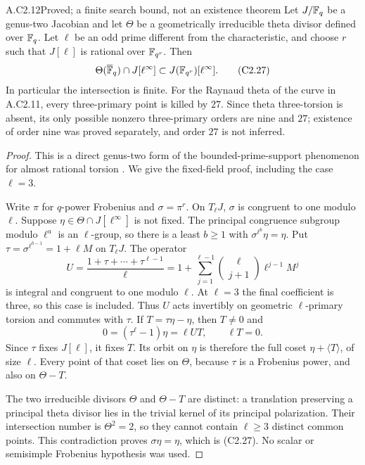 \begin{claim}{A.C2.12}{Proved; a finite search bound, not an existence theorem}
Let $J/\mathbb F_q$ be a genus-two Jacobian and let $\Theta$ be a
geometrically irreducible theta divisor defined over $\mathbb F_q$.
Let $\ell$ be an odd prime different from the characteristic,
and choose $r$ such that $J[\ell]$ is rational over $\mathbb F_{q^r}$.
Then
\[
 \Theta(\overline{\mathbb F}_q)\cap J[\ell^\infty]
       \subset J(\mathbb F_{q^r})[\ell^\infty].                         \tag{C2.27}
\]
In particular the intersection is finite. For the Raynaud theta
of the curve in A.C2.11, every three-primary point is killed by
$27$. Since theta three-torsion is absent, its only possible
nonzero three-primary orders are nine and $27$; existence of
order nine was proved separately, and order $27$ is not inferred.
\end{claim}
\begin{proof}
This is a direct genus-two form of the bounded-prime-support
phenomenon for almost rational torsion
\citep[Proposition 2, p.16]{A_BoxallGrant2006}. We give the
fixed-field proof, including the case $\ell=3$.

Write $\pi$ for $q$-power Frobenius and $\sigma=\pi^r$.
On $T_\ell J$, $\sigma$ is congruent to one modulo $\ell$.
Suppose $\eta\in\Theta\cap J[\ell^\infty]$ is not fixed.
The principal congruence subgroup modulo $\ell^a$ is an
$\ell$-group, so there is a least $b\ge1$ with
$\sigma^{\ell^b}\eta=\eta$. Put
$\tau=\sigma^{\ell^{b-1}}=1+\ell M$ on $T_\ell J$.
The operator
\[
 U=\frac{1+\tau+\cdots+\tau^{\ell-1}}\ell
   =1+\sum_{j=1}^{\ell-1}
       \binom{\ell}{j+1}\ell^{j-1}M^j
\]
is integral and congruent to one modulo $\ell$. At $\ell=3$
the final coefficient is three, so this case is included.
Thus $U$ acts invertibly on geometric $\ell$-primary torsion
and commutes with $\tau$. If $T=\tau\eta-\eta$, then
$T\ne0$ and
\[
                 0=(\tau^\ell-1)\eta=\ell U T,
                 \qquad \ell T=0.
\]
Since $\tau$ fixes $J[\ell]$, it fixes $T$. Its orbit on
$\eta$ is therefore the full coset
$\eta+\langle T\rangle$, of size $\ell$. Every point of
that coset lies on $\Theta$, because $\tau$ is a Frobenius
power, and also on $\Theta-T$.

The two irreducible divisors $\Theta$ and $\Theta-T$ are
distinct: a translation preserving a principal theta divisor
lies in the trivial kernel of its principal polarization.
Their intersection number is $\Theta^2=2$, so they cannot
contain $\ell\ge3$ distinct common points. This contradiction
proves $\sigma\eta=\eta$, which is (C2.27). No scalar or
semisimple Frobenius hypothesis was used.


\end{proof}
